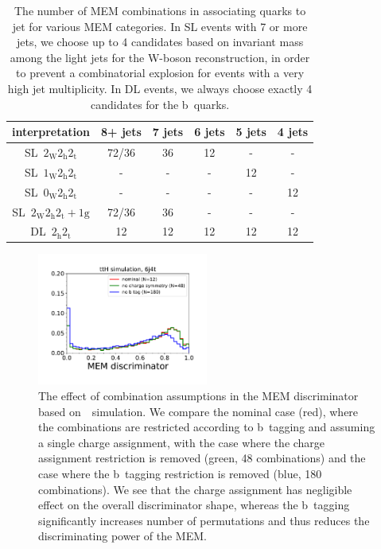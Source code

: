 \begin{table}[h!]
\begin{center}
\begin{tabular}{c|ccccc}
\hline
interpretation& 8+ jets & 7 jets & 6 jets & 5 jets & 4 jets \\
\hline
SL~$2_{\mathrm{W}} 2_{\mathrm{h}} 2_{\mathrm{t}}$ & 72/36 & 36 & 12 & - & - \\
SL~$1_{\mathrm{W}} 2_{\mathrm{h}} 2_{\mathrm{t}}$ & - & - & - & 12 & -\\
SL~$0_{\mathrm{W}} 2_{\mathrm{h}} 2_{\mathrm{t}}$ & - & - & - & - & 12 \\
SL~$2_{\mathrm{W}} 2_{\mathrm{h}} 2_{\mathrm{t}}+1\mathrm{g}$ & 72/36 & 36 & - & - & - \\
\hline
DL~$2_{\mathrm{h}} 2_{\mathrm{t}}$ & 12 & 12 & 12 & 12 & 12 \\
\hline
\hline
\end{tabular}
\caption[The number of transfer function combinations in different categories]{The number of MEM combinations in associating quarks to jet for various MEM categories. In SL events with 7 or more jets, we choose up to 4 candidates based on invariant mass among the light jets for the W-boson reconstruction, in order to prevent a combinatorial explosion for events with a very high jet multiplicity. In DL events, we always choose exactly 4 candidates for the b~quarks.}
\label{tab:category_combinations}
\end{center}
\end{table}

\begin{figure}
\begin{centering}
\includegraphics[width=0.5\textwidth]{figures/mem/mem_assumptions.pdf}
\caption[The effect of combinations assumptions in the MEM]{The effect of combination assumptions in the MEM discriminator based on~\ttHbb~simulation. We compare the nominal case (red), where the combinations are restricted according to b~tagging and assuming a single charge assignment, with the case where the charge assignment restriction is removed (green, 48 combinations) and the case where the b~tagging restriction is removed (blue, 180 combinations). We see that the charge assignment has negligible effect on the overall discriminator shape, whereas the b~tagging significantly increases number of permutations and thus reduces the discriminating power of the MEM.}
\label{fig:mem_assumptions}
\end{centering}
\end{figure}

